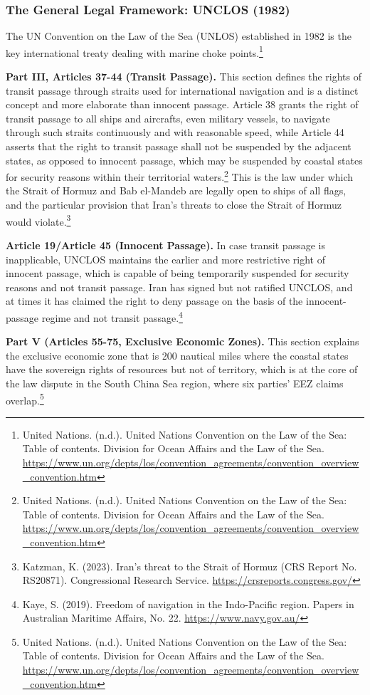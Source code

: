 \subsubsection{The General Legal Framework: UNCLOS (1982)}

The UN Convention on the Law of the Sea (UNLOS) established in 1982 is the key international treaty dealing with marine choke points.\footnote{United Nations. (n.d.). United Nations Convention on the Law of the Sea: Table of contents. Division for Ocean Affairs and the Law of the Sea. \url{https://www.un.org/depts/los/convention_agreements/convention_overview_convention.htm}}

\textbf{Part III, Articles 37-44 (Transit Passage).} This section defines the rights of transit passage through straits used for international navigation and is a distinct concept and more elaborate than innocent passage. Article 38 grants the right of transit passage to all ships and aircrafts, even military vessels, to navigate through such straits continuously and with reasonable speed, while Article 44 asserts that the right to transit passage shall not be suspended by the adjacent states, as opposed to innocent passage, which may be suspended by coastal states for security reasons within their territorial waters.\footnote{United Nations. (n.d.). United Nations Convention on the Law of the Sea: Table of contents. Division for Ocean Affairs and the Law of the Sea. \url{https://www.un.org/depts/los/convention_agreements/convention_overview_convention.htm}} This is the law under which the Strait of Hormuz and Bab el-Mandeb are legally open to ships of all flags, and the particular provision that Iran's threats to close the Strait of Hormuz would violate.\footnote{Katzman, K. (2023). Iran's threat to the Strait of Hormuz (CRS Report No. RS20871). Congressional Research Service. \url{https://crsreports.congress.gov/}}

\textbf{Article 19/Article 45 (Innocent Passage).} In case transit passage is inapplicable, UNCLOS maintains the earlier and more restrictive right of innocent passage, which is capable of being temporarily suspended for security reasons and not transit passage. Iran has signed but not ratified UNCLOS, and at times it has claimed the right to deny passage on the basis of the innocent-passage regime and not transit passage.\footnote{Kaye, S. (2019). Freedom of navigation in the Indo-Pacific region. Papers in Australian Maritime Affairs, No. 22. \url{https://www.navy.gov.au/}}

\textbf{Part V (Articles 55-75, Exclusive Economic Zones).} This section explains the exclusive economic zone that is 200 nautical miles where the coastal states have the sovereign rights of resources but not of territory, which is at the core of the law dispute in the South China Sea region, where six parties’ EEZ claims overlap.\footnote{United Nations. (n.d.). United Nations Convention on the Law of the Sea: Table of contents. Division for Ocean Affairs and the Law of the Sea. \url{https://www.un.org/depts/los/convention_agreements/convention_overview_convention.htm}}

